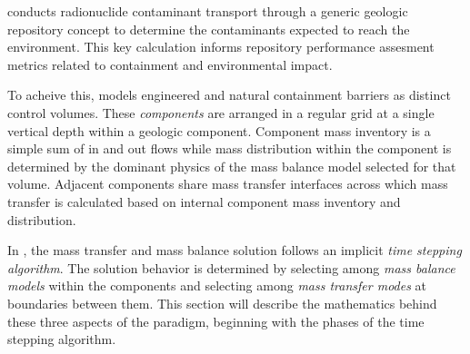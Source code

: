 \Cyder conducts radionuclide contaminant transport through a generic geologic 
repository concept to determine the 
contaminants expected to reach the environment. This key calculation 
informs repository performance assesment metrics related to containment and 
environmental impact.

To acheive this, \Cyder models engineered and natural containment barriers as 
distinct control volumes. These \emph{components} are arranged in a regular 
grid at a single vertical depth within a geologic component.  Component mass 
inventory is a simple sum of in and out flows while mass distribution within 
the component is determined by the dominant physics of the mass balance model 
selected for that volume.  Adjacent components share mass transfer interfaces 
across which mass transfer is calculated based on internal component mass 
inventory and distribution. 

In \Cyder, the mass transfer and mass balance solution follows an implicit 
\emph{time stepping algorithm}. The solution behavior is determined by selecting 
among \emph{mass balance models} within the components and selecting 
among \emph{mass transfer modes} at boundaries between them. This section will describe 
the mathematics behind these three aspects of the \Cyder paradigm, beginning 
with the phases of the time stepping algorithm.
